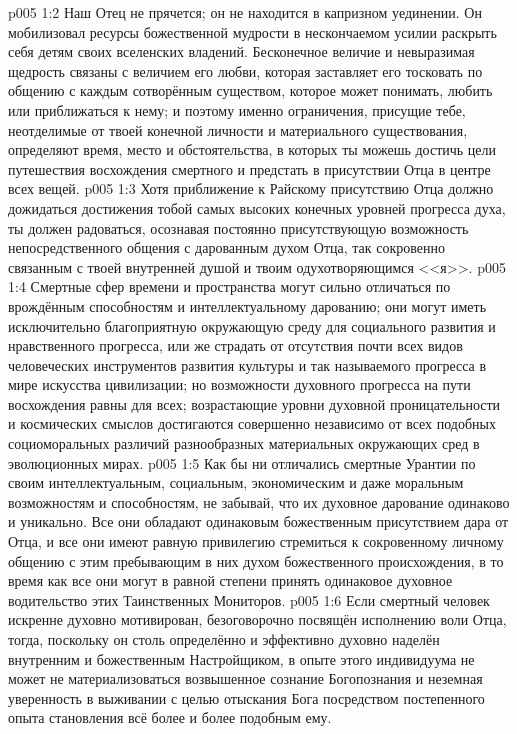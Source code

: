 \vs p005 1:2 Наш Отец не прячется; он не находится в капризном уединении. Он мобилизовал ресурсы божественной мудрости в нескончаемом усилии раскрыть себя детям своих вселенских владений. Бесконечное величие и невыразимая щедрость связаны с величием его любви, которая заставляет его тосковать по общению с каждым сотворённым существом, которое может понимать, любить или приближаться к нему; и поэтому именно ограничения, присущие тебе, неотделимые от твоей конечной личности и материального существования, определяют время, место и обстоятельства, в которых ты можешь достичь цели путешествия восхождения смертного и предстать в присутствии Отца в центре всех вещей.
\vs p005 1:3 \pc Хотя приближение к Райскому присутствию Отца должно дожидаться достижения тобой самых высоких конечных уровней прогресса духа, ты должен радоваться, осознавая постоянно присутствующую возможность непосредственного общения с дарованным духом Отца, так сокровенно связанным с твоей внутренней душой и твоим одухотворяющимся <<я>>.
\vs p005 1:4 Смертные сфер времени и пространства могут сильно отличаться по врождённым способностям и интеллектуальному дарованию; они могут иметь исключительно благоприятную окружающую среду для социального развития и нравственного прогресса, или же страдать от отсутствия почти всех видов человеческих инструментов развития культуры и так называемого прогресса в мире искусства цивилизации; но возможности духовного прогресса на пути восхождения равны для всех; возрастающие уровни духовной проницательности и космических смыслов достигаются совершенно независимо от всех подобных социоморальных различий разнообразных материальных окружающих сред в эволюционных мирах.
\vs p005 1:5 Как бы ни отличались смертные Урантии по своим интеллектуальным, социальным, экономическим и даже моральным возможностям и способностям, не забывай, что их духовное дарование одинаково и уникально. Все они обладают одинаковым божественным присутствием дара от Отца, и все они имеют равную привилегию стремиться к сокровенному личному общению с этим пребывающим в них духом божественного происхождения, в то время как все они могут в равной степени принять одинаковое духовное водительство этих Таинственных Мониторов.
\vs p005 1:6 \pc Если смертный человек искренне духовно мотивирован, безоговорочно посвящён исполнению воли Отца, тогда, поскольку он столь определённо и эффективно духовно наделён внутренним и божественным Настройщиком, в опыте этого индивидуума не может не материализоваться возвышенное сознание Богопознания и неземная уверенность в выживании с целью отыскания Бога посредством постепенного опыта становления всё более и более подобным ему.
